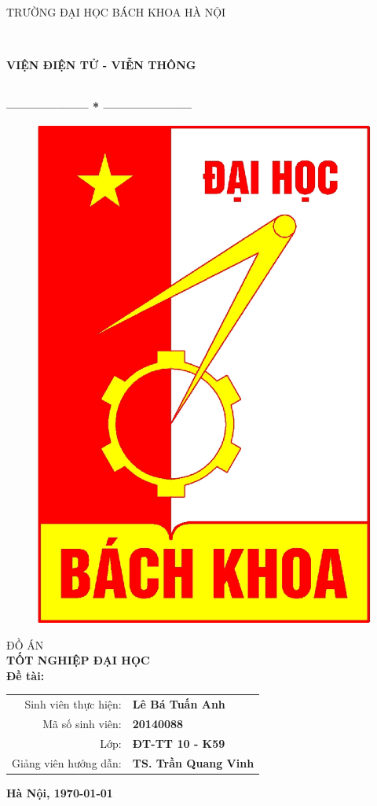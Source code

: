 \thispagestyle{empty}
\thisfancypage{
\setlength{\fboxsep}{0pt}
\fbox}{} 
\begin{center}
\begin{large}
TRƯỜNG ĐẠI HỌC BÁCH KHOA HÀ NỘI
\end{large}\\ \vspace{0.2cm}
\begin{large}
\textbf{VIỆN ĐIỆN TỬ - VIỄN THÔNG}
\end{large} \\
\textbf{--------------------  *  ---------------------}\\[0.5cm]
\begin{figure}[h!]
		\centering
		\includegraphics[width=0.18\linewidth]{image/logobk}
\end{figure}
 \vspace{1cm}

{\fontsize{18pt}{1} \textsc{ĐỒ ÁN}}\\ %
\vspace{0.5cm}
{\fontsize{24pt}{1} \textbf{TỐT NGHIỆP ĐẠI HỌC}}\\[2cm] %
\flushleft \hspace{0.1cm} \fontsize{12pt}{1} \textbf{Đề tài:\\}
\vspace{0.3cm}
\end{center}
\vspace{2cm}
\begin{table}[!htp]
    \centering
    \renewcommand{\arraystretch}{1.2}
    \begin{tabular}{ r l}    
    
    	 Sinh viên thực hiện: & \textbf{Lê Bá Tuấn Anh} \\
    	 Mã số sinh viên: & \textbf{20140088} \\
    	 Lớp: & \textbf{ĐT-TT 10 - K59} \\
    	 Giảng viên hướng dẫn: & \textbf{TS. Trần Quang Vinh} \\
    \end{tabular}
\end{table}


\vspace{2cm}
\begin{center}
{\fontsize{12pt}{1}\textbf{Hà Nội, \today}}\\
\end{center}


